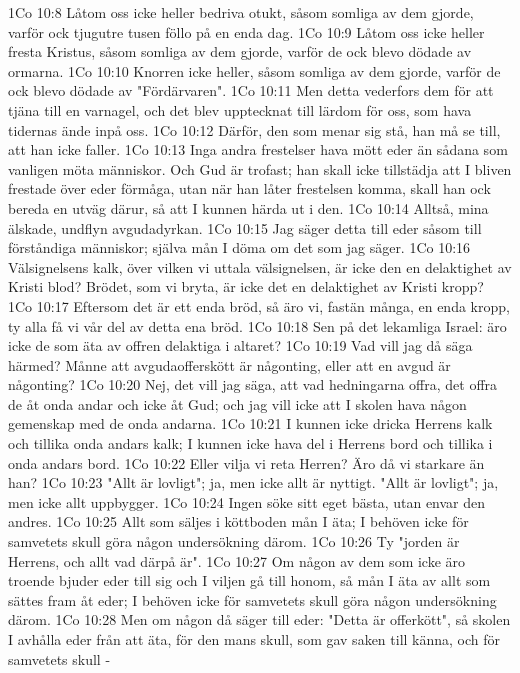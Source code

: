 1Co 10:8  Låtom oss icke heller bedriva otukt, såsom somliga av dem gjorde, varför ock tjugutre tusen föllo på en enda dag.
1Co 10:9  Låtom oss icke heller fresta Kristus, såsom somliga av dem gjorde, varför de ock blevo dödade av ormarna.
1Co 10:10  Knorren icke heller, såsom somliga av dem gjorde, varför de ock blevo dödade av "Fördärvaren".
1Co 10:11  Men detta vederfors dem för att tjäna till en varnagel, och det blev upptecknat till lärdom för oss, som hava tidernas ände inpå oss.
1Co 10:12  Därför, den som menar sig stå, han må se till, att han icke faller.
1Co 10:13  Inga andra frestelser hava mött eder än sådana som vanligen möta människor. Och Gud är trofast; han skall icke tillstädja att I bliven frestade över eder förmåga, utan när han låter frestelsen komma, skall han ock bereda en utväg därur, så att I kunnen härda ut i den.
1Co 10:14  Alltså, mina älskade, undflyn avgudadyrkan.
1Co 10:15  Jag säger detta till eder såsom till förståndiga människor; själva mån I döma om det som jag säger.
1Co 10:16  Välsignelsens kalk, över vilken vi uttala välsignelsen, är icke den en delaktighet av Kristi blod? Brödet, som vi bryta, är icke det en delaktighet av Kristi kropp?
1Co 10:17  Eftersom det är ett enda bröd, så äro vi, fastän många, en enda kropp, ty alla få vi vår del av detta ena bröd.
1Co 10:18  Sen på det lekamliga Israel: äro icke de som äta av offren delaktiga i altaret?
1Co 10:19  Vad vill jag då säga härmed? Månne att avgudaofferskött är någonting, eller att en avgud är någonting?
1Co 10:20  Nej, det vill jag säga, att vad hedningarna offra, det offra de åt onda andar och icke åt Gud; och jag vill icke att I skolen hava någon gemenskap med de onda andarna.
1Co 10:21  I kunnen icke dricka Herrens kalk och tillika onda andars kalk; I kunnen icke hava del i Herrens bord och tillika i onda andars bord.
1Co 10:22  Eller vilja vi reta Herren? Äro då vi starkare än han?
1Co 10:23  "Allt är lovligt"; ja, men icke allt är nyttigt. "Allt är lovligt"; ja, men icke allt uppbygger.
1Co 10:24  Ingen söke sitt eget bästa, utan envar den andres.
1Co 10:25  Allt som säljes i köttboden mån I äta; I behöven icke för samvetets skull göra någon undersökning därom.
1Co 10:26  Ty "jorden är Herrens, och allt vad därpå är".
1Co 10:27  Om någon av dem som icke äro troende bjuder eder till sig och I viljen gå till honom, så mån I äta av allt som sättes fram åt eder; I behöven icke för samvetets skull göra någon undersökning därom.
1Co 10:28  Men om någon då säger till eder: "Detta är offerkött", så skolen I avhålla eder från att äta, för den mans skull, som gav saken till känna, och för samvetets skull -

